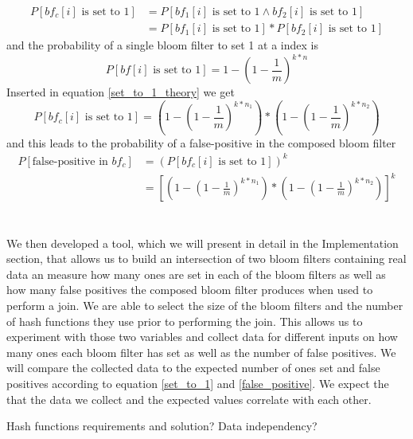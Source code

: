 \documentclass[12]{scrartcl}
\begin{document}
\begin{equation}
\label{set_to_1_theory}
\begin{split}
	P[bf_c[i] \text{ is set to 1}] &= P[bf_1[i] \text{ is set to 1} \wedge bf_2[i] \text{ is set to 1}]\\
	&= P[bf_1[i] \text{ is set to 1}] * P[bf_2[i] \text{ is set to 1}]
\end{split}
\end{equation}
and the probability of a single bloom filter to set 1 at a index is
\begin{equation}
\label{set_to_1}
P[bf[i] \text{ is set to 1}] = 1-(1-\frac{1}{m})^{k*n}
\end{equation}
Inserted in equation \ref{set_to_1_theory} we get
\begin{equation}
\label{set_to_1_composed}
P[bf_c[i] \text{ is set to 1}] = (1-(1-\frac{1}{m})^{k*n_1}) * (1-(1-\frac{1}{m})^{k*n_2})
\end{equation}
and this leads to the probability of a false-positive in the composed bloom filter
\begin{equation}
\label{false_positive}
\begin{split}
P[\text{false-positive in }bf_c] &= (P[bf_c[i] \text{ is set to 1}])^k\\
&= [(1-(1-\frac{1}{m})^{k*n_1}) * (1-(1-\frac{1}{m})^{k*n_2})]^k
\end{split}
\end{equation}\\\\
We then developed a tool, which we will present in detail in the Implementation section, that allows us to build an intersection of two bloom filters containing real data an measure how many ones are set in each of the bloom filters as well as how many false positives the composed bloom filter produces when used to perform a join. We are able to select the size of the bloom filters and the number of hash functions they use prior to performing the join. This allows us to experiment with those two variables and collect data for different inputs on how many ones each bloom filter has set as well as the number of false positives. We will compare the collected data to the expected number of ones set and false positives according to equation \ref{set_to_1} and \ref{false_positive}. We expect the that the data we collect and the expected values correlate with each other.
 
 Hash functions requirements and solution?
 Data independency?
\end{document}
